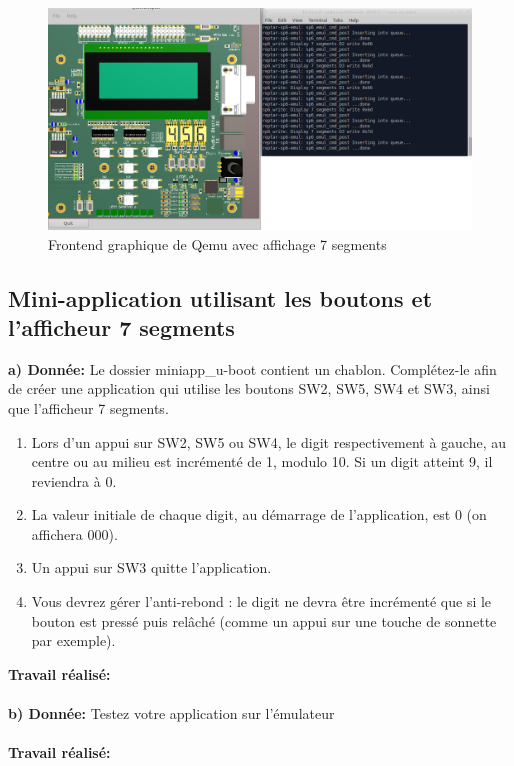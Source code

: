 \begin{figure}[H]
	\begin{center}
		\includegraphics[width=15cm]{img/emulation2.png}
		\caption{Frontend graphique de Qemu avec affichage 7 segments}
		\label{emulation2}
	\end{center}
\end{figure}
\subsection{Mini-application utilisant les boutons et l'afficheur 7 segments}
\textbf{a) Donnée: }Le dossier miniapp\_u-boot contient un chablon. Complétez-le afin de créer une application qui
utilise les boutons SW2, SW5, SW4 et SW3, ainsi que l’afficheur 7 segments.
\begin{enumerate}
	\item Lors d’un appui sur SW2, SW5 ou SW4, le digit respectivement à gauche, au centre ou au
	milieu est incrémenté de 1, modulo 10. Si un digit atteint 9, il reviendra à 0. 
	\item La valeur initiale de chaque digit, au démarrage de l’application, est 0 (on affichera 000). 
	\item Un appui sur SW3 quitte l’application. 
	\item Vous devrez gérer l’anti-rebond : le digit ne devra être incrémenté que si le bouton est
	pressé puis relâché (comme un appui sur une touche de sonnette par exemple). \\
\end{enumerate}
\textbf{Travail réalisé: }\\\\
\textbf{b) Donnée: }Testez votre application sur l’émulateur\\\\
\textbf{Travail réalisé: }\\\\

